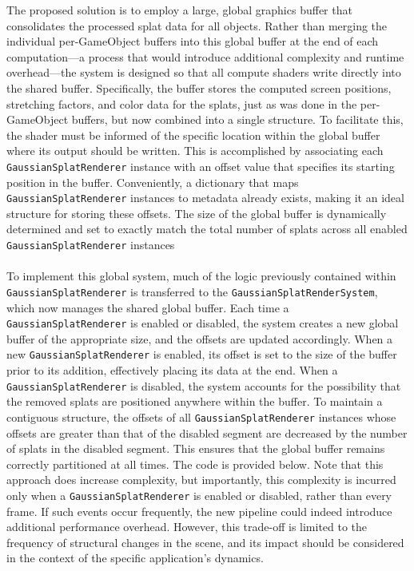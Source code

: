\documentclass[12pt]{article}
\begin{document}
The proposed solution is to employ a large, global graphics buffer that consolidates the processed splat data for all objects. Rather than merging the individual per-GameObject buffers into this global buffer at the end of each computation—a process that would introduce additional complexity and runtime overhead—the system is designed so that all compute shaders write directly into the shared buffer. Specifically, the buffer stores the computed screen positions, stretching factors, and color data for the splats, just as was done in the per-GameObject buffers, but now combined into a single structure. To facilitate this, the shader must be informed of the specific location within the global buffer where its output should be written. This is accomplished by associating each \texttt{GaussianSplatRenderer} instance with an offset value that specifies its starting position in the buffer. Conveniently, a dictionary that maps \texttt{GaussianSplatRenderer} instances to metadata already exists, making it an ideal structure for storing these offsets. The size of the global buffer is dynamically determined and set to exactly match the total number of splats across all enabled \texttt{GaussianSplatRenderer} instances\\\\
To implement this global system, much of the logic previously contained within \texttt{GaussianSplatRenderer} is transferred to the \linebreak \texttt{GaussianSplatRenderSystem}, which now manages the shared global buffer. Each time a \texttt{GaussianSplatRenderer} is enabled or disabled, the system creates a new global buffer of the appropriate size, and the offsets are updated accordingly. When a new \texttt{GaussianSplatRenderer} is enabled, its offset is set to the size of the buffer prior to its addition, effectively placing its data at the end. When a \texttt{GaussianSplatRenderer} is disabled, the system accounts for the possibility that the removed splats are positioned anywhere within the buffer. To maintain a contiguous structure, the offsets of all \texttt{GaussianSplatRenderer} instances whose offsets are greater than that of the disabled segment are decreased by the number of splats in the disabled segment. This ensures that the global buffer remains correctly partitioned at all times. The code is provided below. Note that this approach does increase complexity, but importantly, this complexity is incurred only when a \texttt{GaussianSplatRenderer} is enabled or disabled, rather than every frame. If such events occur frequently, the new pipeline could indeed introduce additional performance overhead. However, this trade-off is limited to the frequency of structural changes in the scene, and its impact should be considered in the context of the specific application’s dynamics.
\end{document}
